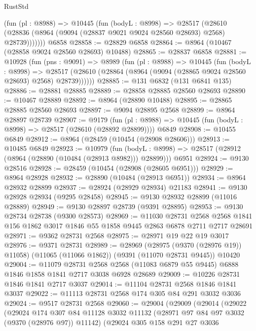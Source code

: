 \begin{lexlean}{RustStd}
\begin{coremodule}
        (fun (pl : @8988) =>
        @10445
          (fun (bodyL : @8998) =>
          @28517
            (@28610 (@28836 (@8964 (@9094 (@28837 @9021 @9024 @28560 @28693) @2568) @28739)))))))
    @6858
@28858 := @28829 @6858
@28864 := @8964 (@10467 (@28858 @9024 @28560 @28693) @10488)
@28865 := @28837 @6858
@28881 := @10928
    (fun (pns : @9091) =>
    @8989
      (fun (pl : @8988) =>
      @10445
        (fun (bodyL : @8998) =>
        @28517 (@28610 (@28864 (@8964 (@9094 (@28865 @9024 @28560 @28693) @2568) @28739))))))
@28885 := @131 @6832 (@131 @6841 @135)
@28886 := @28881 @28885
@28889 := @28858 @28885 @28560 @28693
@28890 := @10467 @28889
@28892 := @8964 (@28890 @10488)
@28895 := @28865 @28885 @28560 @28693
@28897 := @9094 @28895 @2568
@28899 := @8964 @28897 @28739
@28907 := @9179
    (fun (pl : @8988) => @10445 (fun (bodyL : @8998) => @28517 (@28610 (@28892 @28899))))
    @6849
@28908 := @10455 @6849
@28912 := @8964 (@28459 (@10454 (@28908 @28606)))
@28913 := @10485 @6849
@28923 := @10979
    (fun (bodyL : @8998) => @28517 (@28912 (@8964 (@28890 (@10484 (@28913 @8982))) @28899)))
    @6951
@28924 := @9130 @28516
@28928 := @28459 (@10454 (@28908 (@28605 @6951)))
@28929 := @8964 @28928
@28932 := @28890 (@10484 (@28913 @6951))
@28934 := @8964 @28932 @28899
@28937 := @28924 (@28929 @28934) @21183
@28941 := @9130 @28928 @28934 (@9295 @28458)
@28945 := @9130 @28932 @28899 (@11016 @28889)
@28949 := @9130 @28897 @28739 (@9391 @28895)
@28953 := @9130 @28734 @28738 (@9300 @28573)
@28969 := @11030
    @28731
    @2568
    @2568
    @1841
    @156
    @1862
    @3017
    @1846
    @55
    @1858
    @9445
    @2863
    @6878
    @2711
    @2717
    @28691
@28971 := @9362 @28731 @2568
@28975 := @28971 @19 @22 @19 @3017
@28976 := @9371 @28731
@28989 := @28969
    (@28975 (@9370 (@28976 @19)) @11058)
    (@11065 (@11066 @1862))
    (@9391 (@11070 @28731 @9445))
    @10420
@29004 := @11079
    @28731
    @2568
    @2568
    (@11083 @6879 @55 @9445)
    @6888
    @1846
    @1858
    @1841
    @2717
    @3038
    @6928
    @28689
@29009 := @10226 @28731 @1846 @1841 @2717 @3037
@29014 := @11104 @28731 @2568 @1846 @1841 @3037
@29022 := @11113 @28731 @2568 @174 @305 @84 @291 @3032 @3036
@29024 := @9517 @28731 @2568
@29060 := @29004
    (@29009
      (@29014
        (@29022
          (@29024
            @174
            @307
            @84
            @11128
            @3032
            @11132
            (@28971 @97 @84 @97 @3032 (@9370 (@28976 @97)) @11142)
            (@29024
              @305
              @158
              @291
              @27
              @3036

\end{coremodule}
\end{lexlean}
